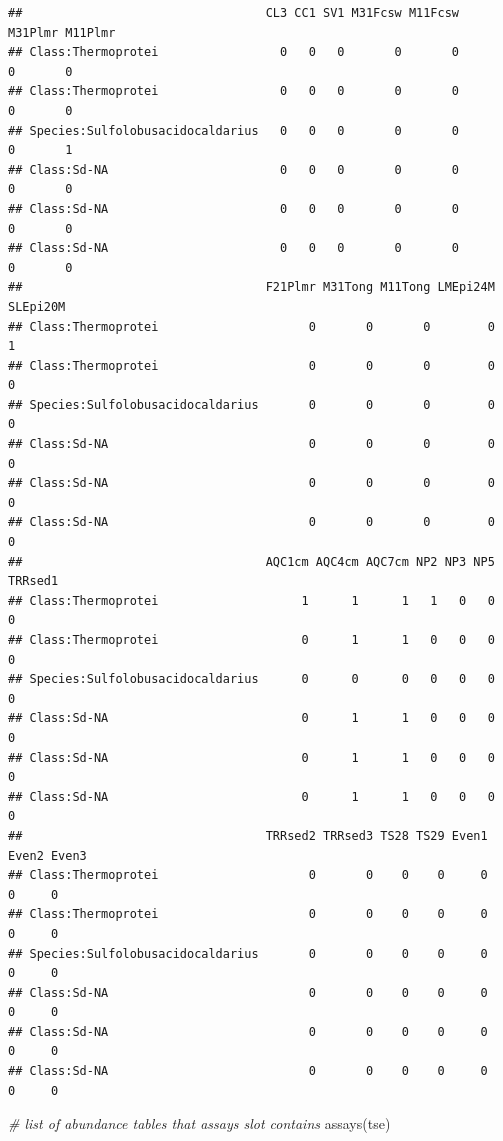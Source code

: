 \documentclass[
]{book}
\newenvironment{Shaded}{\begin{snugshade}}{\end{snugshade}}
\newcommand{\CommentTok}[1]{\textcolor[rgb]{0.56,0.35,0.01}{\textit{#1}}}
\newcommand{\FunctionTok}[1]{\textcolor[rgb]{0.00,0.00,0.00}{#1}}
\newcommand{\NormalTok}[1]{#1}
\begin{document}
\begin{verbatim}
##                                  CL3 CC1 SV1 M31Fcsw M11Fcsw M31Plmr M11Plmr
## Class:Thermoprotei                 0   0   0       0       0       0       0
## Class:Thermoprotei                 0   0   0       0       0       0       0
## Species:Sulfolobusacidocaldarius   0   0   0       0       0       0       1
## Class:Sd-NA                        0   0   0       0       0       0       0
## Class:Sd-NA                        0   0   0       0       0       0       0
## Class:Sd-NA                        0   0   0       0       0       0       0
##                                  F21Plmr M31Tong M11Tong LMEpi24M SLEpi20M
## Class:Thermoprotei                     0       0       0        0        1
## Class:Thermoprotei                     0       0       0        0        0
## Species:Sulfolobusacidocaldarius       0       0       0        0        0
## Class:Sd-NA                            0       0       0        0        0
## Class:Sd-NA                            0       0       0        0        0
## Class:Sd-NA                            0       0       0        0        0
##                                  AQC1cm AQC4cm AQC7cm NP2 NP3 NP5 TRRsed1
## Class:Thermoprotei                    1      1      1   1   0   0       0
## Class:Thermoprotei                    0      1      1   0   0   0       0
## Species:Sulfolobusacidocaldarius      0      0      0   0   0   0       0
## Class:Sd-NA                           0      1      1   0   0   0       0
## Class:Sd-NA                           0      1      1   0   0   0       0
## Class:Sd-NA                           0      1      1   0   0   0       0
##                                  TRRsed2 TRRsed3 TS28 TS29 Even1 Even2 Even3
## Class:Thermoprotei                     0       0    0    0     0     0     0
## Class:Thermoprotei                     0       0    0    0     0     0     0
## Species:Sulfolobusacidocaldarius       0       0    0    0     0     0     0
## Class:Sd-NA                            0       0    0    0     0     0     0
## Class:Sd-NA                            0       0    0    0     0     0     0
## Class:Sd-NA                            0       0    0    0     0     0     0
\end{verbatim}

\begin{Shaded}
\begin{Highlighting}[]
\CommentTok{\# list of abundance tables that assays slot contains}
\FunctionTok{assays}\NormalTok{(tse)}
\end{Highlighting}
\end{Shaded}
\end{document}
